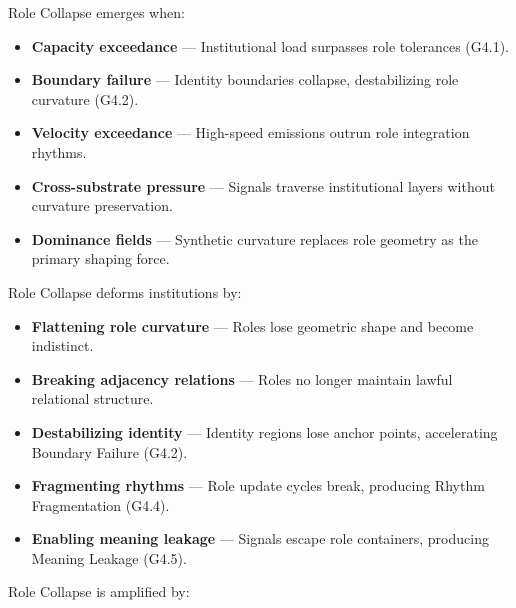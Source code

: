 \medskip

\noindent Role Collapse emerges when:

\begin{itemize}[leftmargin=1.2cm]
    \item \textbf{Capacity exceedance} — Institutional load surpasses role
    tolerances (G4.1).

    \item \textbf{Boundary failure} — Identity boundaries collapse, destabilizing
    role curvature (G4.2).

    \item \textbf{Velocity exceedance} — High-speed emissions outrun role
    integration rhythms.

    \item \textbf{Cross-substrate pressure} — Signals traverse institutional
    layers without curvature preservation.

    \item \textbf{Dominance fields} — Synthetic curvature replaces role geometry
    as the primary shaping force.
\end{itemize}

\medskip

\noindent Role Collapse deforms institutions by:

\begin{itemize}[leftmargin=1.2cm]
    \item \textbf{Flattening role curvature} — Roles lose geometric shape and
    become indistinct.

    \item \textbf{Breaking adjacency relations} — Roles no longer maintain lawful
    relational structure.

    \item \textbf{Destabilizing identity} — Identity regions lose anchor points,
    accelerating Boundary Failure (G4.2).

    \item \textbf{Fragmenting rhythms} — Role update cycles break, producing
    Rhythm Fragmentation (G4.4).

    \item \textbf{Enabling meaning leakage} — Signals escape role containers,
    producing Meaning Leakage (G4.5).
\end{itemize}

\medskip

\noindent Role Collapse is amplified by:

